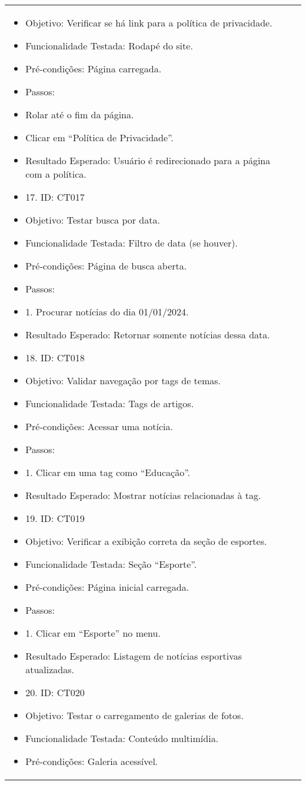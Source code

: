 \documentclass[12pt]{article}
\begin{document}
\begin{tabular}{|>{\bfseries}p{4cm}|p{10cm}|}
\begin{itemize}
\item Objetivo: Verificar se há link para a política de privacidade.
\item Funcionalidade Testada: Rodapé do site.
\item Pré-condições: Página carregada.
\item Passos:
\item Rolar até o fim da página.
\item Clicar em “Política de Privacidade”.
\item Resultado Esperado: Usuário é redirecionado para a página com a política.
\item 17. ID: CT017
\item Objetivo: Testar busca por data.
\item Funcionalidade Testada: Filtro de data (se houver).
\item Pré-condições: Página de busca aberta.
\item Passos:
\item 1. Procurar notícias do dia 01/01/2024.
\item Resultado Esperado: Retornar somente notícias dessa data.
\item 18. ID: CT018
\item Objetivo: Validar navegação por tags de temas.
\item Funcionalidade Testada: Tags de artigos.
\item Pré-condições: Acessar uma notícia.
\item Passos:
\item 1. Clicar em uma tag como “Educação”.
\item Resultado Esperado: Mostrar notícias relacionadas à tag.
\item 19. ID: CT019
\item Objetivo: Verificar a exibição correta da seção de esportes.
\item Funcionalidade Testada: Seção “Esporte”.
\item Pré-condições: Página inicial carregada.
\item Passos:
\item 1. Clicar em “Esporte” no menu.
\item Resultado Esperado: Listagem de notícias esportivas atualizadas.
\item 20. ID: CT020
\item Objetivo: Testar o carregamento de galerias de fotos.
\item Funcionalidade Testada: Conteúdo multimídia.
\item Pré-condições: Galeria acessível.

\end{itemize}
\end{tabular}
\end{document}
